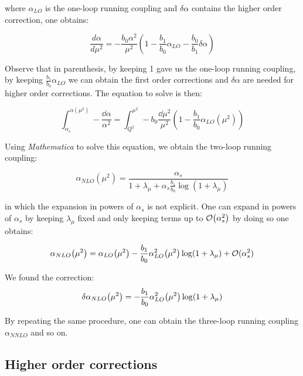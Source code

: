 \documentclass[../main.tex]{subfiles}
\begin{document}
where $\alpha_{LO}$ is the one-loop running coupling and $\delta\alpha$ contains the higher order correction, one obtains:

\begin{equation}
    \frac{d\alpha}{d\mu^2} = - \frac{b_0 \alpha^2}{\mu^2} ( 1 - \frac{b_1}{b_0} \alpha_{LO} - \frac{b_0}{b_1} \delta\alpha)
\end{equation}

Observe that in parenthesis, by keeping 1 gave us the one-loop running coupling, by keeping $\frac{b_1}{b_0} \alpha_{LO}$ we can obtain the first order corrections
and $\delta\alpha$ are needed for higher order corrections. The equation to solve is then:

\begin{equation}
    \int_{\alpha_s}^{\alpha(\mu^2)} -\frac{\dd\alpha}{\alpha^2} = 
    \int _{Q^2}^{\mu^2} - b_0 \frac{ \dd\mu^2}{\mu^2} ( 1 - \frac{b_1}{b_0} \alpha_{LO}(\mu^2) )
\end{equation}

Using \emph{Mathematica} to solve this equation, we obtain the two-loop running coupling:

\begin{equation}
    \alpha_{NLO}(\mu^2) = \frac{\alpha_s}{1+\lambda_\mu + \alpha_s \frac{b_1}{b_0} \log(1+\lambda_\mu)}
\end{equation}

in which the expansion in powers of $\alpha_s$ is not explicit. One can expand 
in powers of $\alpha_s$ by keeping $\lambda_\mu$ fixed and only keeping terms up to 
$\order{\alpha_s^2}$ by doing so one obtains:

\begin{equation}\label{eq:NLO}
    \alpha_{NLO}\qty(\mu^2) = \alpha_{LO}\qty(\mu^2) -\frac{b_1}{b_0} \alpha_{LO}^2\qty(\mu^2) \log(1+\lambda_\mu) + \mathcal{O}(\alpha_s^2)
\end{equation}

We found the correction: 
\begin{equation}\label{eq:DNLO}
\delta\alpha_{NLO}\qty(\mu^2) = -\frac{b_1}{b_0} \alpha_{LO}^2\qty(\mu^2) \log(1+\lambda_\mu)
\end{equation}

By repeating the same procedure, one can obtain the three-loop running coupling $\alpha_{NNLO}$ and so on.

\subsection{Higher order corrections}
\end{document}
